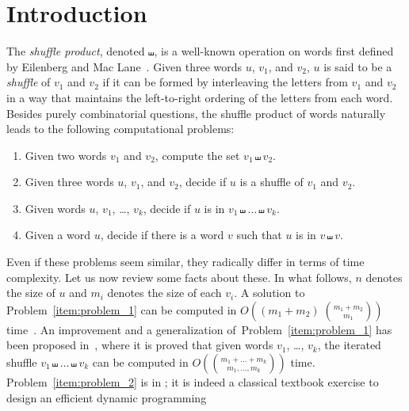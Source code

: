 \documentclass[a4paper]{llncs}
\begin{document}
\section{Introduction}
\label{section:Introduction}
The {\em shuffle product}, denoted $\shuffle$, is a well-known operation on words
first defined by Eilenberg and Mac Lane~\cite{Eilenberg:MacLane:1953}.
Given three words $u$, $v_1$, and $v_2$, $u$ is said to be a \emph{shuffle}
of $v_1$ and $v_2$ if it can be formed by interleaving the letters from
$v_1$ and $v_2$ in a way that maintains the left-to-right ordering of the
letters from each word.
Besides purely combinatorial questions,
the shuffle product of words naturally leads to the following computational
problems:
\begin{enumerate}
    \item \label{item:problem_1}
    Given two words $v_1$ and $v_2$, compute the set $v_1 \shuffle v_2$.
    \item \label{item:problem_2}
    Given three words $u$, $v_1$, and $v_2$, decide if $u$ is a shuffle
    of $v_1$ and $v_2$.
    \item \label{item:problem_3}
    Given words $u$, $v_1$, \dots, $v_k$, decide if $u$ is in
    $v_1 \shuffle \dots \shuffle v_k$.
    \item \label{item:problem_4}
    Given a word $u$, decide if there is a word $v$ such that $u$ is
    in $v \shuffle v$.
\end{enumerate}
Even if these problems seem similar, they radically differ in terms
of time complexity. Let us now review some facts about these. In what follows,
$n$ denotes the size of $u$ and $m_i$ denotes the size of each $v_i$.
A solution to Problem~\ref{item:problem_1} can be computed in
$O\left((m_1 + m_2) \; \binom{m_1 + m_2}{m_1}\right)$
time~\cite{Spehner:TCS:1986}. An improvement and a generalization
of~Problem~\ref{item:problem_1} has been proposed
in~\cite{Allauzen:IGM:2000}, where it is proved that given words
$v_1$, \dots, $v_k$, the iterated shuffle
$v_1 \shuffle \dots \shuffle v_k$ can be computed in
$O\left(\binom{m_1 + \dots + m_k}{m_1, \dots, m_k}\right)$
time. Problem~\ref{item:problem_2} is in \Pclass; it is indeed a
classical textbook exercise to design an efficient dynamic programming
\end{document}
